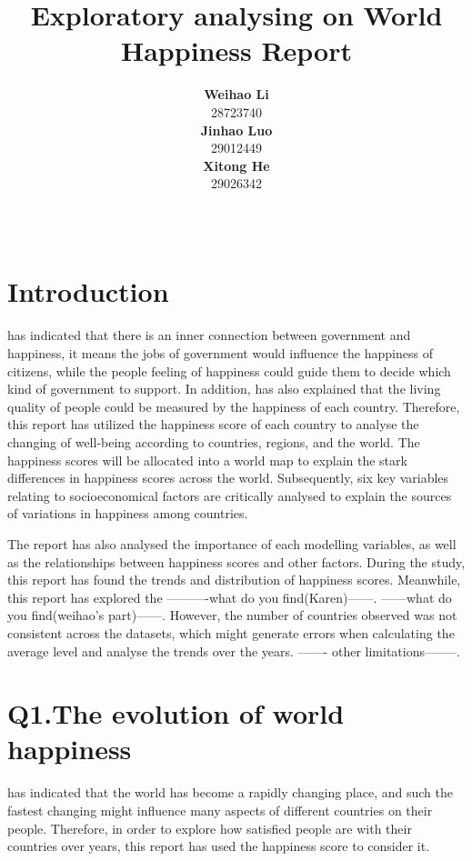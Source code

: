 \documentclass[11pt,a4paper,]{article}
\title{Exploratory analysing on World Happiness Report}
\author{\sf\Large\textbf{ Weihao Li}\\ {\sf\large 28723740\\[0.5cm]} \sf\Large\textbf{ Jinhao Luo}\\ {\sf\large 29012449\\[0.5cm]} \sf\Large\textbf{ Xitong He}\\ {\sf\large 29026342\\[0.5cm]}}
\date{\sf\Date~\Month~\Year}
\makeatletter
\def\titlepage{\front{\expandafter{\@title}}{\@author}{\@organization}}
\makeatother
\begin{document}
\titlepage

\clearpage

\hypertarget{introduction}{%
\section{Introduction}\label{introduction}}

\textcite{helliwell2019world} has indicated that there is an inner connection between government and happiness, it means the jobs of government would influence the happiness of citizens, while the people feeling of happiness could guide them to decide which kind of government to support. In addition, \textcite{helliwell2019world} has also explained that the living quality of people could be measured by the happiness of each country. Therefore, this report has utilized the happiness score of each country to analyse the changing of well-being according to countries, regions, and the world. The happiness scores will be allocated into a world map to explain the stark differences in happiness scores across the world. Subsequently, six key variables relating to socioeconomical factors are critically analysed to explain the sources of variations in happiness among countries.

The report has also analysed the importance of each modelling variables, as well as the relationships between happiness scores and other factors. During the study, this report has found the trends and distribution of happiness scores. Meanwhile, this report has explored the ----------what do you find(Karen)------. ------what do you find(weihao's part)------. However, the number of countries observed was not consistent across the datasets, which might generate errors when calculating the average level and analyse the trends over the years. ------- other limitations--------.

\clearpage

\hypertarget{q1.the-evolution-of-world-happiness}{%
\section{Q1.The evolution of world happiness}\label{q1.the-evolution-of-world-happiness}}

\textcite{helliwell2019world} has indicated that the world has become a rapidly changing place, and such the fastest changing might influence many aspects of different countries on their people. Therefore, in order to explore how satisfied people are with their countries over years, this report has used the happiness score to consider it.
\end{document}
